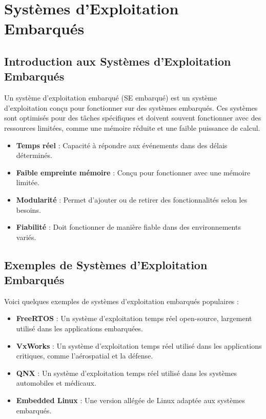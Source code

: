 \documentclass[10pt,a4paper]{article}
\begin{document}

\section*{Systèmes d'Exploitation Embarqués}

\subsection*{Introduction aux Systèmes d'Exploitation Embarqués}

Un système d'exploitation embarqué (SE embarqué) est un système d'exploitation conçu pour fonctionner sur des systèmes embarqués. Ces systèmes sont optimisés pour des tâches spécifiques et doivent souvent fonctionner avec des ressources limitées, comme une mémoire réduite et une faible puissance de calcul.

\begin{itemize}
    \item \textbf{Temps réel} : Capacité à répondre aux événements dans des délais déterminés.
    \item \textbf{Faible empreinte mémoire} : Conçu pour fonctionner avec une mémoire limitée.
    \item \textbf{Modularité} : Permet d'ajouter ou de retirer des fonctionnalités selon les besoins.
    \item \textbf{Fiabilité} : Doit fonctionner de manière fiable dans des environnements variés.
\end{itemize}


\subsection*{Exemples de Systèmes d'Exploitation Embarqués}

Voici quelques exemples de systèmes d'exploitation embarqués populaires :

\begin{itemize}
    \item \textbf{FreeRTOS} : Un système d'exploitation temps réel open-source, largement utilisé dans les applications embarquées.
    \item \textbf{VxWorks} : Un système d'exploitation temps réel utilisé dans les applications critiques, comme l'aérospatial et la défense.
    \item \textbf{QNX} : Un système d'exploitation temps réel utilisé dans les systèmes automobiles et médicaux.
    \item \textbf{Embedded Linux} : Une version allégée de Linux adaptée aux systèmes embarqués.
\end{itemize}
\end{document}
